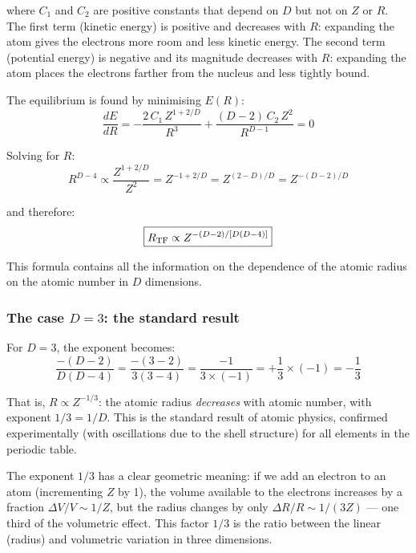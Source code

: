 \documentclass[10pt,a4paper]{article}
\begin{document}
where $C_1$ and $C_2$ are positive constants that depend on $D$ but not on $Z$ or $R$. The first term (kinetic energy) is positive and decreases with $R$: expanding the atom gives the electrons more room and less kinetic energy. The second term (potential energy) is negative and its magnitude decreases with $R$: expanding the atom places the electrons farther from the nucleus and less tightly bound.

The equilibrium is found by minimising $E(R)$:
\begin{equation}
\frac{dE}{dR} = -\frac{2\,C_1\,Z^{1+2/D}}{R^3} + \frac{(D-2)\,C_2\,Z^2}{R^{D-1}} = 0
\end{equation}

Solving for $R$:
\begin{equation}
R^{D-4} \propto \frac{Z^{1+2/D}}{Z^2} = Z^{-1+2/D} = Z^{(2-D)/D} = Z^{-(D-2)/D}
\end{equation}

and therefore:
\begin{equation}\label{eq:R_TF}
\boxed{R_{\rm TF} \propto Z^{-(D-2)/[D(D-4)]}}
\end{equation}

This formula contains all the information on the dependence of the atomic radius on the atomic number in $D$ dimensions.

\subsubsection{The case $D = 3$: the standard result}

For $D = 3$, the exponent becomes:
\begin{equation}
\frac{-(D-2)}{D(D-4)} = \frac{-(3-2)}{3(3-4)} = \frac{-1}{3 \times (-1)} = +\frac{1}{3} \times (-1) = -\frac{1}{3}
\end{equation}

That is, $R \propto Z^{-1/3}$: the atomic radius \textit{decreases} with atomic number, with exponent $1/3 = 1/D$. This is the standard result of atomic physics, confirmed experimentally (with oscillations due to the shell structure) for all elements in the periodic table.

The exponent $1/3$ has a clear geometric meaning: if we add an electron to an atom (incrementing $Z$ by 1), the volume available to the electrons increases by a fraction $\Delta V/V \sim 1/Z$, but the radius changes by only $\Delta R/R \sim 1/(3Z)$ --- one third of the volumetric effect. This factor $1/3$ is the ratio between the linear (radius) and volumetric variation in three dimensions.
\end{document}
